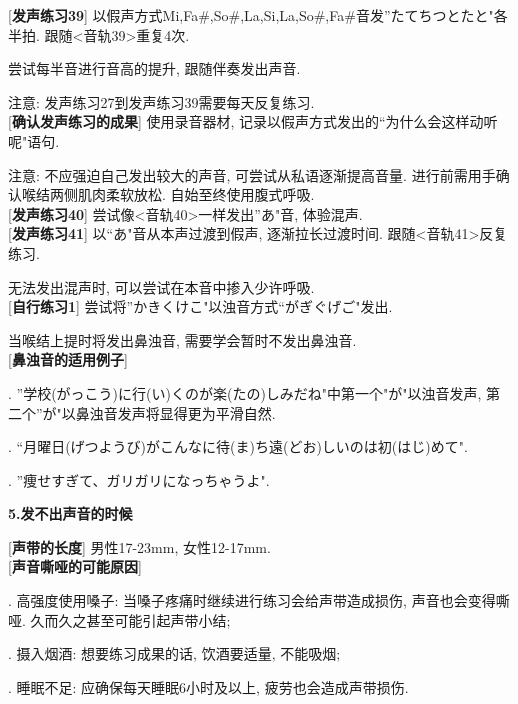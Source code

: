 [\textbf{发声练习39}] 以假声方式Mi,Fa\#,So\#,La,Si,La,So\#,Fa\#音发''たてちつとたと"各半拍. 跟随<音轨39>重复4次.\par
\qquad 尝试每半音进行音高的提升, 跟随伴奏发出声音.\par
\qquad 注意: 发声练习27到发声练习39需要每天反复练习.\\

[\textbf{确认发声练习的成果}] 使用录音器材, 记录以假声方式发出的``为什么会这样动听呢"语句.\par
\qquad 注意: 不应强迫自己发出较大的声音, 可尝试从私语逐渐提高音量. 进行前需用手确认喉结两侧肌肉柔软放松. 自始至终使用腹式呼吸.\\

[\textbf{发声练习40}] 尝试像<音轨40>一样发出''あ"音, 体验混声.\\

[\textbf{发声练习41}] 以``あ"音从本声过渡到假声, 逐渐拉长过渡时间. 跟随<音轨41>反复练习.\par
\qquad 无法发出混声时, 可以尝试在本音中掺入少许呼吸.\\

[\textbf{自行练习1}] 尝试将''かきくけこ"以浊音方式``がぎぐげご"发出.\par
\qquad 当喉结上提时将发出鼻浊音, 需要学会暂时不发出鼻浊音.\\

[\textbf{鼻浊音的适用例子}] \par
{}. \mincho ''学校(がっこう)に行(い)くのが楽(たの)しみだね"\rmfamily 中第一个"が"以浊音发声, 第二个''が"以鼻浊音发声将显得更为平滑自然.\par
{}. \mincho ``月曜日(げつようび)がこんなに待(ま)ち遠(どお)しいのは初(はじ)めて".\rmfamily \par
{}. \mincho ''痩せすぎて、ガリガリになっちゃうよ".\rmfamily\\

\clearpage

\begin{center}
 \textbf{5.发不出声音的时候}
\end{center}

[\textbf{声带的长度}] 男性17-23mm, 女性12-17mm.\\

[\textbf{声音嘶哑的可能原因}] \par
{}. 高强度使用嗓子: 当嗓子疼痛时继续进行练习会给声带造成损伤, 声音也会变得嘶哑. 久而久之甚至可能引起声带小结;\par
{}. 摄入烟酒: 想要练习成果的话, 饮酒要适量, 不能吸烟;\par
{}. 睡眠不足: 应确保每天睡眠6小时及以上, 疲劳也会造成声带损伤.\\

